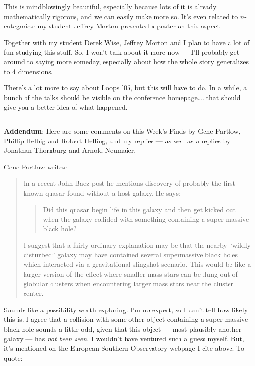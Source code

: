 \documentclass{article}
\begin{document}
This is mindblowingly beautiful, especially because lots of it is
already mathematically rigorous, and we can easily make more so. It's
even related to \(n\)-categories: my student Jeffrey Morton presented a
poster on this aspect.

Together with my student Derek Wise, Jeffrey Morton and I plan to have a
lot of fun studying this stuff. So, I won't talk about it more now ---
I'll probably get around to saying more someday, especially about how
the whole story generalizes to 4 dimensions.

There's a lot more to say about Loops '05, but this will have to do. In
a while, a bunch of the talks should be visible on the conference
homepage\ldots. that should give you a better idea of what happened.

\begin{center}\rule{0.5\linewidth}{0.5pt}\end{center}

\textbf{Addendum}: Here are some comments on this Week's Finds by Gene
Partlow, Phillip Helbig and Robert Helling, and my replies --- as well
as a replies by Jonathan Thornburg and Arnold Neumaier.

Gene Partlow writes:

\begin{quote}
In a recent John Baez post he mentions discovery of probably the first
known quasar found without a host galaxy. He says:

\begin{quote}
Did this quasar begin life in this galaxy and then get kicked out when
the galaxy collided with something containing a super-massive black
hole?
\end{quote}

I suggest that a fairly ordinary explanation may be that the nearby
``wildly disturbed'' galaxy may have contained several supermassive
black holes which interacted via a gravitational slingshot scenario.
This would be like a larger version of the effect where smaller mass
stars can be flung out of globular clusters when encountering larger
mass stars near the cluster center.
\end{quote}

Sounds like a possibility worth exploring. I'm no expert, so I can't
tell how likely this is. I agree that a collision with some other object
containing a super-massive black hole sounds a little odd, given that
this object --- most plausibly another galaxy --- has \emph{not been
seen}. I wouldn't have ventured such a guess myself. But, it's mentioned
on the European Southern Observatory webpage I cite above. To quote:
\end{document}
